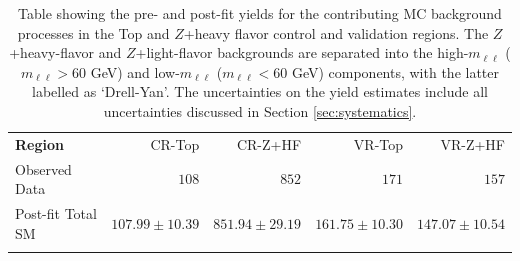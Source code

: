 \begin{table}
\begin{center}
\caption{
Table showing the pre- and post-fit yields for the contributing MC background processes in the
Top and $Z$+heavy flavor control and validation regions.
The $Z$+heavy-flavor and $Z$+light-flavor backgrounds are separated into the high-$m_{\ell \ell}$
($m_{\ell \ell} > 60$ GeV) and low-$m_{\ell \ell}$ ($m_{\ell \ell} < 60$ GeV) components,
with the latter labelled as `Drell-Yan'.
The uncertainties on the yield estimates include all uncertainties discussed in Section \ref{sec:systematics}.
}
\label{tab:hh_crvr_yields}
\setlength{\tabcolsep}{0.0pc}
{\small
\begin{tabular*}{\textwidth}{@{\extracolsep{\fill}}lrrrr}
\noalign{\smallskip}\hline\noalign{\smallskip}
\textbf{Region}          & CR-Top            & CR-Z+HF            & VR-Top            & VR-Z+HF              \\[-0.05cm]
\noalign{\smallskip}\hline\noalign{\smallskip}
 Observed Data         & $108$              & $852$              & $171$              & $157$                    \\
\noalign{\smallskip}\hline\noalign{\smallskip}
 Post-fit Total SM          & $107.99 \pm 10.39$          & $851.94 \pm 29.19$          & $161.75 \pm 10.30$          & $147.07 \pm 10.54$              \\
\noalign{\smallskip}\hline\noalign{\smallskip}


\end{tabular*}}
\end{center}
\end{table}
